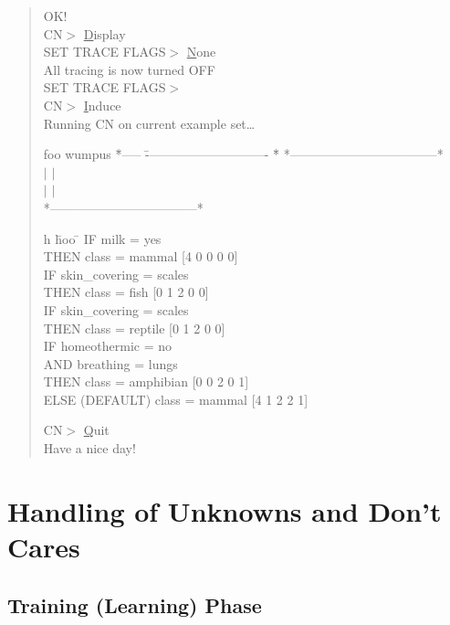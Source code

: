 \begin{quotation}
OK! \\
CN$>$ \underline{D}isplay \\
SET TRACE FLAGS$>$ \underline{N}one \\
  All tracing is now turned OFF \\
SET TRACE FLAGS$>$ \ret \\
CN$>$ \underline{I}nduce \\
Running CN on current example set\ldots \\
\begin{tabbing}
foo wumpus \=     *----- \= ----------------------------- \= * \kill
\>         *-----------------------------------* \\
\>         $\mid$ \>                      \>  $\mid$ \\
\>         $\mid$ \> \raisebox{1.5ex}{UN-ORDERED RULE LIST}  \> $\mid$ \\
\>         *-----------------------------------* \\
\end{tabbing}
\begin{tabbing}
h \= hoo \= \kill
IF \>\>    milk = yes \\
THEN \>\>  class = mammal  [4 0 0 0 0]  \\[2.5ex]
IF \>\>    skin\_covering = scales \label{little_rules}  \\ 
THEN \>\>  class = fish  [0 1 2 0 0] \\[2.5ex]
IF \>\>    skin\_covering = scales \\
THEN \>\>  class = reptile  [0 1 2 0 0] \\[2.5ex]
IF \>\>    homeothermic = no \\
\>  AND \> breathing = lungs \\
THEN \>\>  class = amphibian  [0 0 2 0 1] \\[2.5ex]
ELSE (DEFAULT) class = mammal  [4 1 2 2 1] \\
\end{tabbing}
\vspace{-5ex}
CN$>$ \underline{Q}uit \\
Have a nice day! \\
\end{quotation}

\section{Handling of Unknowns and Don't Cares}
\label{unknown}
\subsection{Training (Learning) Phase}

